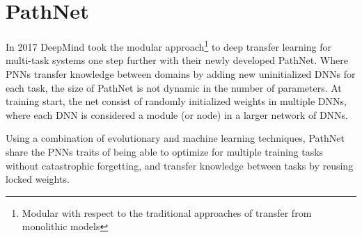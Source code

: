 \documentclass[a4paper,english]{report}
\begin{document}
\section{PathNet}\label{pathnet}
In 2017 DeepMind took the modular approach\footnote{Modular with respect to the traditional approaches of transfer from monolithic models} to deep transfer learning for multi-task systems one step further with their newly developed PathNet. Where PNNs transfer knowledge between domains by adding new uninitialized DNNs for each task, the size of PathNet is not dynamic in the number of parameters. At training start, the net consist of randomly initialized weights in multiple DNNs, where each DNN is considered a module (or node) in a larger network of DNNs. 

Using a combination of evolutionary and machine learning techniques, PathNet share the PNNs traits of being able to optimize for multiple training tasks without catastrophic forgetting, and transfer knowledge between tasks by reusing locked weights.  
\end{document}

